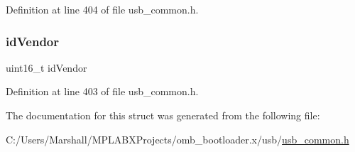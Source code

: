 Definition at line 404 of file usb\+\_\+common.\+h.

\mbox{\label{struct__override__client__driver__data_ab393e07556e3858fed36ed2e260d4b4c}} 
\subsubsection{\texorpdfstring{idVendor}{idVendor}}
{\footnotesize\ttfamily uint16\+\_\+t id\+Vendor}



Definition at line 403 of file usb\+\_\+common.\+h.



The documentation for this struct was generated from the following file\+:\begin{DoxyCompactItemize}
\item 
C\+:/\+Users/\+Marshall/\+M\+P\+L\+A\+B\+X\+Projects/omb\+\_\+bootloader.\+x/usb/\mbox{\hyperlink{usb__common_8h}{usb\+\_\+common.\+h}}\end{DoxyCompactItemize}
